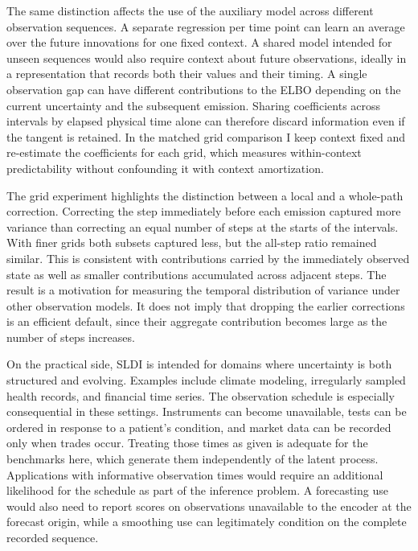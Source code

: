 \documentclass[12pt]{article}
\begin{document}
The same distinction affects the use of the auxiliary model across different observation sequences. A separate regression per time point can learn an average over the future innovations for one fixed context. A shared model intended for unseen sequences would also require context about future observations, ideally in a representation that records both their values and their timing. A single observation gap can have different contributions to the ELBO depending on the current uncertainty and the subsequent emission. Sharing coefficients across intervals by elapsed physical time alone can therefore discard information even if the tangent is retained. In the matched grid comparison I keep context fixed and re-estimate the coefficients for each grid, which measures within-context predictability without confounding it with context amortization.

The grid experiment highlights the distinction between a local and a whole-path correction. Correcting the step immediately before each emission captured more variance than correcting an equal number of steps at the starts of the intervals. With finer grids both subsets captured less, but the all-step ratio remained similar. This is consistent with contributions carried by the immediately observed state as well as smaller contributions accumulated across adjacent steps. The result is a motivation for measuring the temporal distribution of variance under other observation models. It does not imply that dropping the earlier corrections is an efficient default, since their aggregate contribution becomes large as the number of steps increases.

On the practical side, SLDI is intended for domains where uncertainty is both structured and evolving. Examples include climate modeling, irregularly sampled health records, and financial time series. The observation schedule is especially consequential in these settings. Instruments can become unavailable, tests can be ordered in response to a patient's condition, and market data can be recorded only when trades occur. Treating those times as given is adequate for the benchmarks here, which generate them independently of the latent process. Applications with informative observation times would require an additional likelihood for the schedule as part of the inference problem. A forecasting use would also need to report scores on observations unavailable to the encoder at the forecast origin, while a smoothing use can legitimately condition on the complete recorded sequence.
\end{document}

